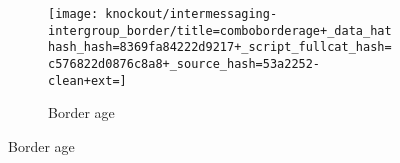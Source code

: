 \begin{figure}[!htbp]
\begin{center}



\hspace*{\fill}%
\begin{minipage}[t]{0.8\columnwidth}
\centering
\vspace{0pt} %
\begin{subfigure}[b]{\textwidth}
\texttt{[image: knockout/intermessaging-intergroup\_border/title=comboborderage+\_data\_hathash\_hash=8369fa84222d9217+\_script\_fullcat\_hash=c576822d0876c8a8+\_source\_hash=53a2252-clean+ext=]}%
\caption{Border age}
\label{fig:intermessaging-intergroup_border-borderage}
\end{subfigure}
\end{minipage}%
\hspace*{\fill}

\vspace{1ex}



\end{center}
\end{figure}
